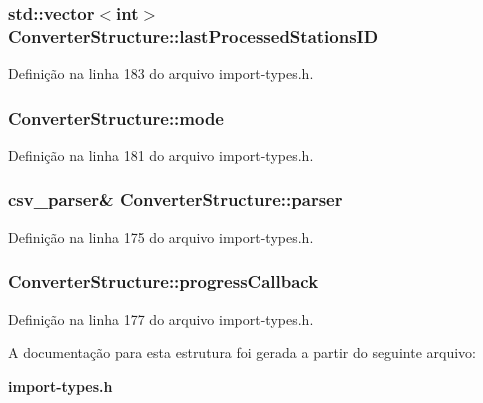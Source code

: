 \subsubsection[{last\+Processed\+Stations\+ID}]{\setlength{\rightskip}{0pt plus 5cm}std\+::vector$<$int$>$ Converter\+Structure\+::last\+Processed\+Stations\+ID}\label{struct_converter_structure_ae8a18ddab9119f753854786473e9a122}


Definição na linha 183 do arquivo import-\/types.\+h.

\subsubsection[{mode}]{ Converter\+Structure\+::mode}\label{struct_converter_structure_a9b9cfea15cd11e7980fd36b19f3c6ed4}


Definição na linha 181 do arquivo import-\/types.\+h.

\subsubsection[{parser}]{\setlength{\rightskip}{0pt plus 5cm}csv\+\_\+parser\& Converter\+Structure\+::parser}\label{struct_converter_structure_a485787a5914b45d489e55400e491de29}


Definição na linha 175 do arquivo import-\/types.\+h.

\subsubsection[{progress\+Callback}]{ Converter\+Structure\+::progress\+Callback}\label{struct_converter_structure_a2dee2571d6c0e2579057a577f7490e60}


Definição na linha 177 do arquivo import-\/types.\+h.



A documentação para esta estrutura foi gerada a partir do seguinte arquivo\+:\begin{DoxyCompactItemize}
\item 
{\bf import-\/types.\+h}\end{DoxyCompactItemize}
